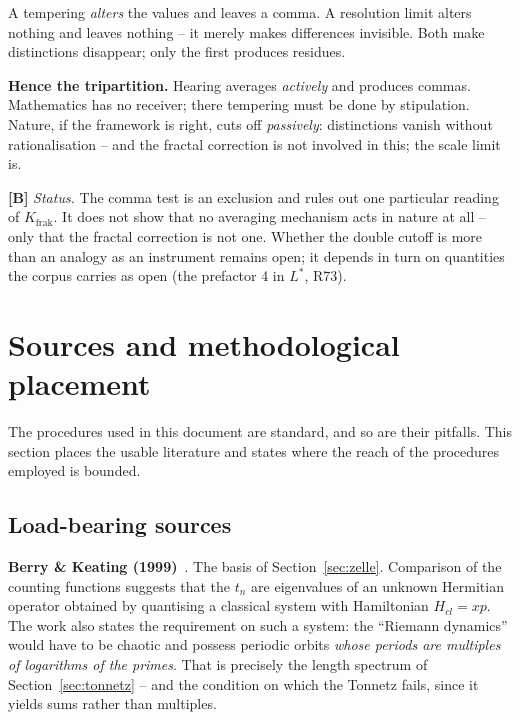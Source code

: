 \begin{highlight}
A tempering \emph{alters} the values and leaves a comma. A resolution
limit alters nothing and leaves nothing -- it merely makes differences
invisible. Both make distinctions disappear; only the first produces
residues.
\end{highlight}

\textbf{Hence the tripartition.} Hearing averages \emph{actively} and
produces commas. Mathematics has no receiver; there tempering must be
done by stipulation. Nature, if the framework is right, cuts off
\emph{passively}: distinctions vanish without rationalisation -- and the
fractal correction is not involved in this; the scale limit is.

\textbf{[B]} \emph{Status.} The comma test is an exclusion and rules
out one particular reading of $K_\text{frak}$. It does not show that no
averaging mechanism acts in nature at all -- only that the fractal
correction is not one. Whether the double cutoff is more than an
analogy as an instrument remains open; it depends in turn on quantities
the corpus carries as open (the prefactor 4 in $L^*$, R73).

\section{Sources and methodological placement}
\label{sec:quellen}

The procedures used in this document are standard, and so are their
pitfalls. This section places the usable literature and states where
the reach of the procedures employed is bounded.

\subsection{Load-bearing sources}

\textbf{Berry \& Keating (1999)}~\cite{berry1999}. The basis of
Section~\ref{sec:zelle}. Comparison of the counting functions suggests
that the $t_n$ are eigenvalues of an unknown Hermitian operator
obtained by quantising a classical system with Hamiltonian
$H_{cl} = xp$. The work also states the requirement on such a system:
the \enquote{Riemann dynamics} would have to be chaotic and possess
periodic orbits \emph{whose periods are multiples of logarithms of the
primes}. That is precisely the length spectrum of
Section~\ref{sec:tonnetz} -- and the condition on which the Tonnetz
fails, since it yields sums rather than multiples.

